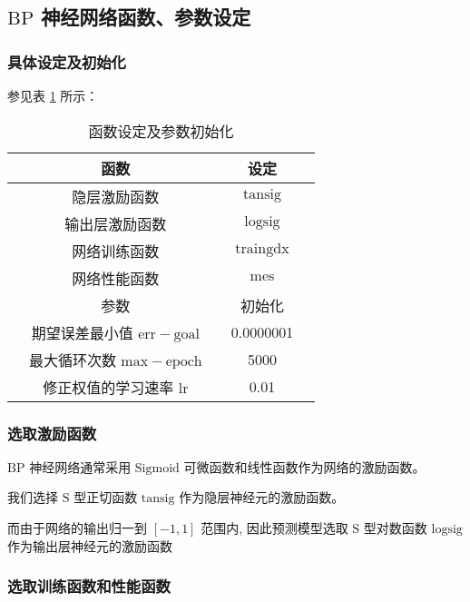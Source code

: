 \subsection{$\mathrm{BP}$ 神经网络函数、参数设定}

  \subsubsection{具体设定及初始化}
    参见表 \ref{tab:shedingchushihua} 所示：
    \begin{table}[thb]
      \centering
      \caption{函数设定及参数初始化}
      \begin{tabular*}{0.618\paperwidth}{@{\extracolsep{\fill}}ccccc}
        \toprule[1.5pt]
        &函数 && 设定 &\\
        \midrule[1pt]
        &隐层激励函数 && $\mathrm{tansig}$ &\\
        &输出层激励函数 && $\mathrm{logsig}$ &\\
        &网络训练函数 && $\mathrm{traingdx}$ &\\
        &网络性能函数 && $\mathrm{mes}$ &\\
        \midrule[1pt]
        \midrule[1pt]
        &参数 && 初始化 &\\
        \midrule[1pt]
        &期望误差最小值 $\mathrm{err-goal}$ && 0.0000001 &\\
        &最大循环次数 $\mathrm{max-epoch}$ && 5000 &\\
        &修正权值的学习速率 $\mathrm{lr}$ && 0.01 &\\
        \bottomrule[1.5pt]
      \end{tabular*}
      \label{tab:shedingchushihua}
    \end{table}

  \subsubsection{选取激励函数}

    \cite{Sallybin2013}$\mathrm{BP}$ 神经网络通常采用 $\mathrm{Sigmoid}$ 可微函数和线性函数作为网络的激励函数。

    我们选择 $\mathrm{S}$ 型正切函数 $\mathrm{tansig}$ 作为隐层神经元的激励函数。

    而由于网络的输出归一到 $\left[ -1, 1 \right]$ 范围内, 因此预测模型选取 $\mathrm{S}$ 型对数函数 $\mathrm{logsig}$ 作为输出层神经元的激励函数

  \subsubsection{选取训练函数和性能函数}

